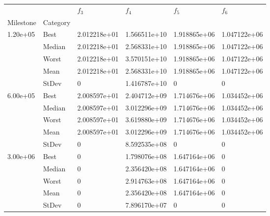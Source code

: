 \begin{tabular}{llllll}
\toprule
         &      &      $f_{3}$ &      $f_{4}$ &      $f_{5}$ &      $f_{6}$ \\
Milestone & Category &              &              &              &              \\
\midrule
\multirow{5}{*}{1.20e+05} & Best & 2.012218e+01 & 1.566511e+10 & 1.918865e+06 & 1.047122e+06 \\
         & Median & 2.012218e+01 & 2.568331e+10 & 1.918865e+06 & 1.047122e+06 \\
         & Worst & 2.012218e+01 & 3.570151e+10 & 1.918865e+06 & 1.047122e+06 \\
         & Mean & 2.012218e+01 & 2.568331e+10 & 1.918865e+06 & 1.047122e+06 \\
         & StDev &            0 & 1.416787e+10 &            0 &            0 \\
\cline{1-6}
\multirow{5}{*}{6.00e+05} & Best & 2.008597e+01 & 2.404712e+09 & 1.714676e+06 & 1.034452e+06 \\
         & Median & 2.008597e+01 & 3.012296e+09 & 1.714676e+06 & 1.034452e+06 \\
         & Worst & 2.008597e+01 & 3.619880e+09 & 1.714676e+06 & 1.034452e+06 \\
         & Mean & 2.008597e+01 & 3.012296e+09 & 1.714676e+06 & 1.034452e+06 \\
         & StDev &            0 & 8.592535e+08 &            0 &            0 \\
\cline{1-6}
\multirow{5}{*}{3.00e+06} & Best &            0 & 1.798076e+08 & 1.647164e+06 &            0 \\
         & Median &            0 & 2.356420e+08 & 1.647164e+06 &            0 \\
         & Worst &            0 & 2.914763e+08 & 1.647164e+06 &            0 \\
         & Mean &            0 & 2.356420e+08 & 1.647164e+06 &            0 \\
         & StDev &            0 & 7.896170e+07 &            0 &            0 \\
\bottomrule
\end{tabular}

